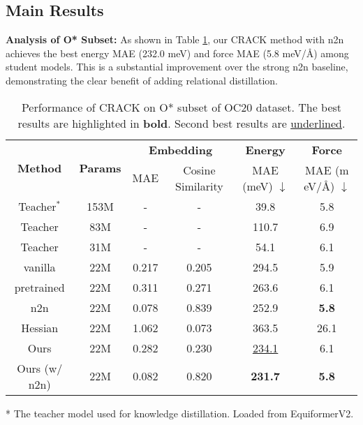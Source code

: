 \documentclass{article}
\begin{document}
\subsection{Main Results}

\textbf{Analysis of O* Subset:} As shown in Table \ref{tab:crack-oc20}, our CRACK method with n2n achieves the best energy MAE (232.0 meV) and force MAE (5.8 meV/Å) among student models. 
This is a substantial improvement over the strong n2n baseline, demonstrating the clear benefit of adding relational distillation.

\begin{table}[htbp]
\centering
\caption{Performance of CRACK on O* subset of OC20 dataset. The best results are highlighted in \textbf{bold}. Second best results are \underline{underlined}.}
\label{tab:crack-oc20}
\begin{adjustbox}{max width=0.8\textwidth}
\begin{threeparttable}
\begin{tabular}{cccccc}
\toprule
\multirow{2}{*}{\textbf{Method}} & \multirow{2}{*}{\textbf{Params}} & \multicolumn{2}{c}{\textbf{Embedding}} & \textbf{Energy} & \textbf{Force} \\
\cmidrule(lr){3-6}
 & & MAE & Cosine Similarity & MAE (meV) $\downarrow$ & MAE (m eV/Å) $\downarrow$ \\
\midrule
Teacher$^*$ & 153M & - & - & 39.8 & 5.8 \\
Teacher & 83M & - & - & 110.7 & 6.9 \\
Teacher & 31M & - & - & 54.1 & 6.1 \\
\midrule
vanilla & 22M & 0.217 & 0.205 & 294.5 & 5.9 \\ 
pretrained & 22M & 0.311 & 0.271 & 263.6 & 6.1 \\ 
n2n & 22M & 0.078 & 0.839 & 252.9 & \textbf{5.8} \\ 
Hessian & 22M & 1.062 & 0.073 & 363.5 & 26.1 \\ 
\midrule
Ours & 22M & 0.282 & 0.230 & \underline{234.1} & 6.1 \\ 
Ours (w/ n2n) & 22M & 0.082 & 0.820 & \textbf{231.7} & \textbf{5.8} \\ 
\bottomrule 
\end{tabular}
\begin{tablenotes}
\small
\item[*] The teacher model used for knowledge distillation. Loaded from EquiformerV2.
\end{tablenotes}
\end{threeparttable}
\end{adjustbox}
\end{table}
\end{document}
